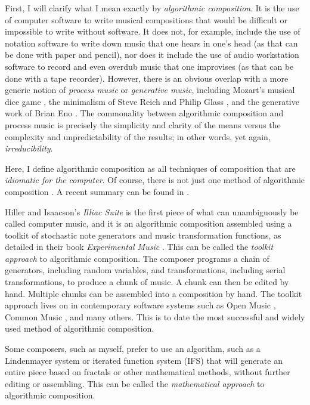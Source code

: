 \documentclass[11pt]{scrartcl}
\begin{document}
First, I will clarify what I mean exactly by \emph{algorithmic composition}. It is the use of computer software to write musical compositions that would be difficult or impossible to write without software. It does not, for example, include the use of notation software to write down music that one hears in one's head (as that can be done with paper and pencil), nor does it include the use of audio workstation software to record and even overdub music that one improvises (as that can be done with a tape recorder). However, there is an obvious overlap with a more generic notion of \emph{process music} or \emph{generative music}, including Mozart's musical dice game \cite{humdrumdice}, the minimalism of Steve Reich \cite{reichprocess, 10.2307/832600} and Philip Glass \cite{potter2002four, glass2015words}, and the generative work of Brian Eno \cite{eno1996generative}. The commonality between algorithmic composition and process music is precisely the simplicity and clarity of the means versus the complexity and unpredictability of the results; in other words, yet again, \emph{irreducibility}. 

Here, I define algorithmic composition as all techniques of composition that are \emph{idiomatic for the computer}. Of course, there is not just one method of algorithmic composition \cite{fernandez2013ai, arizanet}. A recent summary can be found in \cite{mclean2018oxford}.

Hiller and Isaacson's \emph{Illiac Suite} \cite{illiacsuite} is the first piece of what can unambiguously be called computer music, and it is an algorithmic composition assembled using a toolkit of stochastic note generators and music transformation functions, as detailed in their book \emph{Experimental Music} \cite{hiller}. This can be called the \emph{toolkit approach} to algorithmic composition. The composer programs a chain of generators, including random variables, and transformations, including serial transformations, to produce a chunk of music. A chunk can then be edited by hand. Multiple chunks can be assembled into a composition by hand. The toolkit approach lives on in contemporary software systems such as Open Music \cite{OpenMusic}, Common Music \cite{musx}, and many others. This is to date the most successful and widely used method of algorithmic composition.

Some composers, such as myself, prefer to use an algorithm, such as a Lindenmayer system \cite{algorithmicbeautyofplants, prusinkiewicz1986sgs,  fractalmusicwithstringrewritinggrammars} or iterated function system (IFS) \cite{fractalseverywhere, ifsmusic} that will generate an entire piece based on fractals or other mathematical methods, without further editing or assembling. This can be called the \emph{mathematical approach} to algorithmic composition.
\end{document}
